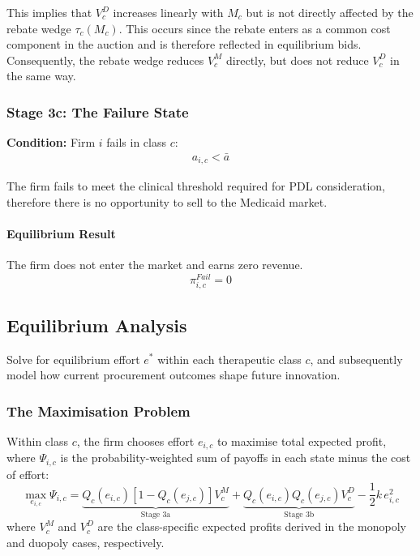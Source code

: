 \documentclass[12pt]{article}
\begin{document}
This implies that $V_c^D$ increases linearly with $M_c$ but is not directly affected by the rebate wedge $\tau_c(M_c)$. This occurs since the rebate enters as a common cost component in the auction and is therefore reflected in equilibrium bids. Consequently, the rebate wedge reduces $V_c^M$ directly, but does not reduce $V_c^D$ in the same way.

\subsubsection{Stage 3c: The Failure State}
\textbf{Condition:} Firm $i$ fails in class $c$:
\begin{align*}
    a_{i,c} < \bar{a}
\end{align*}

The firm fails to meet the clinical threshold required for PDL consideration, therefore there is no opportunity to sell to the Medicaid market.

\paragraph{Equilibrium Result}
The firm does not enter the market and earns zero revenue.
\begin{equation}
    \pi_{i,c}^{Fail} = 0
\end{equation}

\subsection{Equilibrium Analysis}
Solve for equilibrium effort $e^*$ within each therapeutic class $c$, and subsequently model how current procurement outcomes shape future innovation.

\subsubsection{The Maximisation Problem}
Within class $c$, the firm chooses effort $e_{i,c}$ to maximise total expected profit, where $\Psi_{i,c}$ is the probability-weighted sum of payoffs in each state minus the cost of effort:
\begin{equation}
    \max_{e_{i,c}} \Psi_{i,c} = \underbrace{Q_c(e_{i,c})[1-Q_c(e_{j,c})] V_c^M}_{\text{Stage 3a}} + \underbrace{Q_c(e_{i,c})Q_c(e_{j,c}) V_c^D}_{\text{Stage 3b}} - \frac{1}{2} k \, e_{i,c}^2
\end{equation}
where $V_c^M$ and $V_c^D$ are the class-specific expected profits derived in the monopoly and duopoly cases, respectively.
\end{document}

